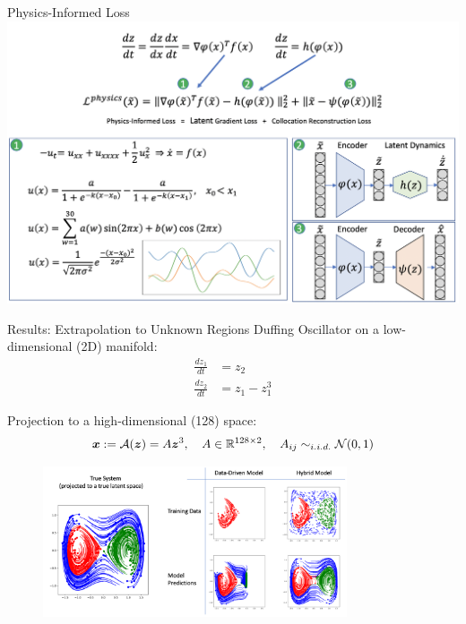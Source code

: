 \documentclass[8pt]{beamer}
\begin{document}
\begin{frame}{Physics-Informed Loss}
	\includegraphics[width=\textwidth]{Figures/collocations_5.png}
\end{frame}


\begin{frame}{Results: Extrapolation to Unknown Regions}
Duffing Oscillator on a low-dimensional (2D) manifold:
\begin{equation}
    \label{eq:duffing_definition}
    \begin{split}
    \frac{dz_1}{dt} & = z_2 \\ 
    \frac{dz_2}{dt} & = z_1 - z_1^3
    \end{split}
\end{equation}

Projection to a high-dimensional (128) space:
\begin{equation}
    \label{eq:duffing_true_decoder}
    \boldsymbol{x} := \mathcal{A}(\boldsymbol{z}) = A\boldsymbol{z}^3, \quad A \in \mathbb{R}^{128 \times 2}, \quad A_{ij} \sim_{i.i.d.} \mathcal{N}(0, 1)
\end{equation}

\begin{figure}
	\centering
	\includegraphics[width=0.8\textwidth]{Figures/duff_results.png}
\end{figure}

\end{frame}
\end{document}
